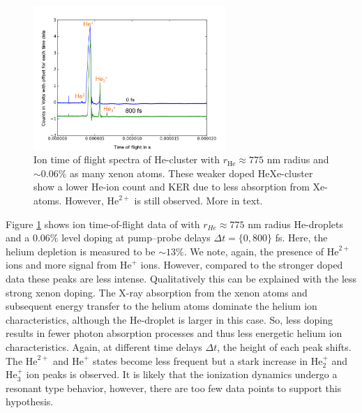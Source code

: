 \begin{figure}
 	\centering
 		\includegraphics[width=0.65\textwidth]{images/results/TOF-helium-xenon-cluster-13.png}
 	\caption[TOF spectra of HeXe-clusters with $\sim 0.06\%$ Xe-doping at various delays $\Delta t$.]{Ion time of flight spectra of He-cluster with $r_{\text{He}}\approx 775$ nm radius and $\sim 0.06\%$ as many xenon atoms. These weaker doped HeXe-cluster show a lower He-ion count and KER due to less absorption from Xe-atoms. However, $\text{He}^{2+}$ is still observed. More in text.}
 	\label{fig:TOF-helium-xenon-cluster-13}
\end{figure}
Figure \ref{fig:TOF-helium-xenon-cluster-13} shows ion time-of-flight data of with $r_{He}\approx 775$ nm radius He-droplets and a $0.06 \%$ level doping at pump--probe delays $\Delta t=\{0, 800\}$ fs. Here, the helium depletion is measured to be $\sim 13\%$. We note, again, the presence of $\text{He}^{2+}$ ions and more signal from $\text{He}^{+}$ ions. However, compared to the stronger doped data these peaks are less intense. Qualitatively this can be explained with the less strong xenon doping. The X-ray absorption from the xenon atoms and subsequent energy transfer to the helium atoms dominate the helium ion characteristics, although the He-droplet is larger in this case. So, less doping results in fewer photon absorption processes and thus less energetic helium ion characteristics. Again, at different time delays $\Delta t$, the height of each peak shifts. The $\text{He}^{2+}$ and $\text{He}^{+}$ states become less frequent but a stark increase in $\text{He}_{2}^{+}$ and $\text{He}_{3}^{+}$ ion peaks is observed. It is likely that the ionization dynamics undergo a resonant type behavior, however, there are too few data points to support this hypothesis.\\
